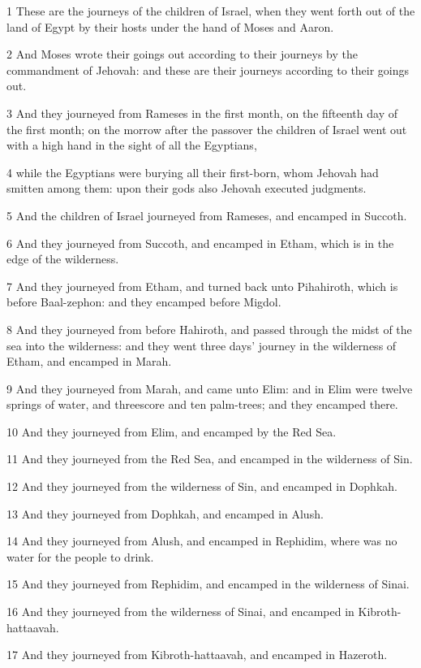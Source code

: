 \par 1 These are the journeys of the children of Israel, when they went forth out of the land of Egypt by their hosts under the hand of Moses and Aaron.
\par 2 And Moses wrote their goings out according to their journeys by the commandment of Jehovah: and these are their journeys according to their goings out.
\par 3 And they journeyed from Rameses in the first month, on the fifteenth day of the first month; on the morrow after the passover the children of Israel went out with a high hand in the sight of all the Egyptians,
\par 4 while the Egyptians were burying all their first-born, whom Jehovah had smitten among them: upon their gods also Jehovah executed judgments.
\par 5 And the children of Israel journeyed from Rameses, and encamped in Succoth.
\par 6 And they journeyed from Succoth, and encamped in Etham, which is in the edge of the wilderness.
\par 7 And they journeyed from Etham, and turned back unto Pihahiroth, which is before Baal-zephon: and they encamped before Migdol.
\par 8 And they journeyed from before Hahiroth, and passed through the midst of the sea into the wilderness: and they went three days' journey in the wilderness of Etham, and encamped in Marah.
\par 9 And they journeyed from Marah, and came unto Elim: and in Elim were twelve springs of water, and threescore and ten palm-trees; and they encamped there.
\par 10 And they journeyed from Elim, and encamped by the Red Sea.
\par 11 And they journeyed from the Red Sea, and encamped in the wilderness of Sin.
\par 12 And they journeyed from the wilderness of Sin, and encamped in Dophkah.
\par 13 And they journeyed from Dophkah, and encamped in Alush.
\par 14 And they journeyed from Alush, and encamped in Rephidim, where was no water for the people to drink.
\par 15 And they journeyed from Rephidim, and encamped in the wilderness of Sinai.
\par 16 And they journeyed from the wilderness of Sinai, and encamped in Kibroth-hattaavah.
\par 17 And they journeyed from Kibroth-hattaavah, and encamped in Hazeroth.
